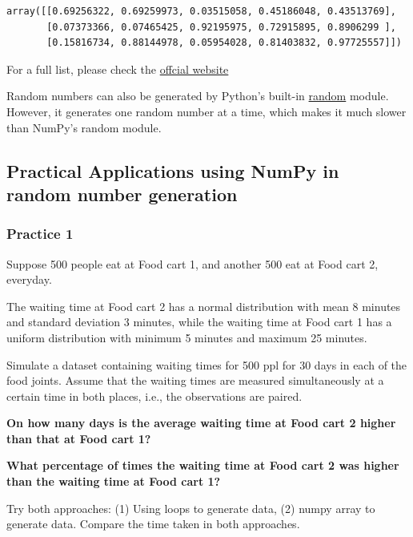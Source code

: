 \documentclass[
  letterpaper,
  DIV=11,
  numbers=noendperiod]{scrreprt}
\begin{document}
\begin{verbatim}
array([[0.69256322, 0.69259973, 0.03515058, 0.45186048, 0.43513769],
       [0.07373366, 0.07465425, 0.92195975, 0.72915895, 0.8906299 ],
       [0.15816734, 0.88144978, 0.05954028, 0.81403832, 0.97725557]])
\end{verbatim}

For a full list, please check the
\href{https://numpy.org/doc/stable/reference/random/generated/numpy.random.randint.html}{offcial
website}

Random numbers can also be generated by Python's built-in
\href{https://docs.python.org/3/library/random.html}{random} module.
However, it generates one random number at a time, which makes it much
slower than NumPy's random module.

\hypertarget{practical-applications-using-numpy-in-random-number-generation}{%
\subsection{Practical Applications using NumPy in random number
generation}\label{practical-applications-using-numpy-in-random-number-generation}}

\hypertarget{practice-1-1}{%
\subsubsection{Practice 1}\label{practice-1-1}}

Suppose 500 people eat at Food cart 1, and another 500 eat at Food cart
2, everyday.

The waiting time at Food cart 2 has a normal distribution with mean 8
minutes and standard deviation 3 minutes, while the waiting time at Food
cart 1 has a uniform distribution with minimum 5 minutes and maximum 25
minutes.

Simulate a dataset containing waiting times for 500 ppl for 30 days in
each of the food joints. Assume that the waiting times are measured
simultaneously at a certain time in both places, i.e., the observations
are paired.

\textbf{On how many days is the average waiting time at Food cart 2
higher than that at Food cart 1?}

\textbf{What percentage of times the waiting time at Food cart 2 was
higher than the waiting time at Food cart 1?}

Try both approaches: (1) Using loops to generate data, (2) numpy array
to generate data. Compare the time taken in both approaches.
\end{document}
